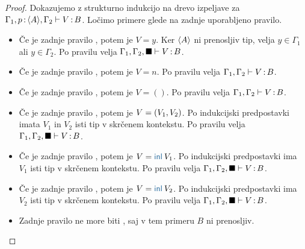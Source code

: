 \begin{proof}
	Dokazujemo z strukturno indukcijo na drevo izpeljave za $\Gamma_1, p \mathinner{:} \langle A \rangle, \Gamma_2 \vdash V \mathinner{:} B$.
	Ločimo primere glede na zadnje uporabljeno pravilo.
	
	\begin{itemize}
		\item[\sitem] Če je zadnje pravilo , potem je $V = y$. Ker $\langle A \rangle$ ni prenosljiv tip, velja $y \in \Gamma_1$ ali $y \in \Gamma_2$.
		Po pravilu  velja $\Gamma_1, \Gamma_2, \blacksquare \vdash V \mathinner{:} B$.
		
		\item Če je zadnje pravilo , potem je $V = n$. Po pravilu  velja $\Gamma_1, \Gamma_2 \vdash V \mathinner{:} B$.

		\item Če je zadnje pravilo , potem je $V = ()$. Po pravilu  velja $\Gamma_1, \Gamma_2 \vdash V \mathinner{:} B$.
		
		\item Če je zadnje pravilo , potem je $V =( V_1 , V_2 )$.
		Po indukcijski predpostavki imata $V_1$ in $V_2$ isti tip v skrčenem kontekstu.
		Po pravilu  velja $\Gamma_1, \Gamma_2, \blacksquare \vdash V \mathinner{:} B$.
		
		\item Če je zadnje pravilo , potem je $V = \tminl{V_1}$.
		Po indukcijski predpostavki ima $V_1$ isti tip v skrčenem kontekstu.
		Po pravilu  velja $\Gamma_1, \Gamma_2, \blacksquare \vdash V \mathinner{:} B$.
		
		\item Če je zadnje pravilo , potem je $V = \tminl{V_2}$.
		Po indukcijski predpostavki ima $V_2$ isti tip v skrčenem kontekstu.
		Po pravilu  velja $\Gamma_1, \Gamma_2, \blacksquare \vdash V \mathinner{:} B$.
		
		\item Zadnje pravilo ne more biti , saj v tem primeru $B$ ni prenosljiv.
		

\end{itemize}
\end{proof}
